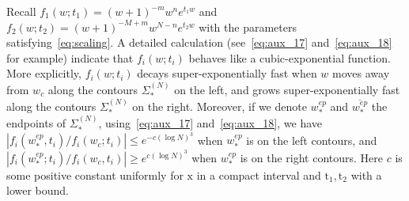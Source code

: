 \documentclass{article}
\numberwithin{equation}{section}
\begin{document}
Recall $f_1(w;t_1)=(w+1)^{-m}w^{n}e^{t_1w}$ and $f_2(w;t_2)=(w+1)^{-M+m}w^{N-n}e^{t_2w}$ with the parameters satisfying~\eqref{eq:scaling}. A detailed calculation (see~\eqref{eq:aux_17} and~\eqref{eq:aux_18} for example) indicate that $f_i(w;t_i)$ behaves like a cubic-exponential function. More explicitly, $f_i(w;t_i)$ decays super-exponentially fast when $w$ moves away from $w_c$ along the contours $\Sigma_{*}^{(N)}$ on the left, and grows super-exponentially fast along the contours $\Sigma_{*}^{(N)}$ on the right. Moreover, if we denote $w_*^{ep}$ and $\overline{w_*^{ep}}$ the endpoints of $\Sigma_*^{(N)}$, using~\eqref{eq:aux_17} and~\eqref{eq:aux_18}, we have $|f_i(w_*^{ep},t_i)/f_i(w_c;t_i)|\le e^{-c(\log N)^3}$ when $w_*^{ep}$ is on the left contours, and $|f_i(w_*^{ep};t_i)/f_i(w_c,t_i)|\ge e^{c(\log N)^3}$ when $w_*^{ep}$ is on the right contours. Here $c$ is some positive constant uniformly for $\mathrm{x}$ in a compact interval and $\mathrm{t}_1,\mathrm{t}_2$ with a lower bound.
\end{document}
